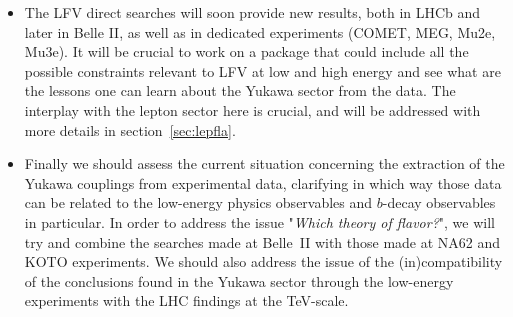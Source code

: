 \begin{itemize}
\item The LFV direct searches will soon provide new results, both in LHCb and later in Belle II, as well as in dedicated experiments (COMET, MEG, Mu2e, Mu3e). It will be crucial to work on a package that could include all the possible constraints relevant to LFV at low and high energy and see what are the lessons one can learn about the Yukawa sector from the data. The interplay with the lepton sector here is crucial, and will be addressed  with more details in section~\ref{sec:lepfla}. 
\item Finally we should assess the current situation concerning the extraction of the Yukawa couplings from experimental data, clarifying in which way those data can be related to the low-energy physics observables and 
$b$-decay observables in particular. In order to address the issue "{\it Which theory of flavor?}",  we will try and combine the searches made at Belle~II with those made at NA62 and KOTO experiments.  
We should also address the issue of the (in)compatibility of the conclusions found in the Yukawa sector through the low-energy experiments with the LHC findings at the TeV-scale. 
\end{itemize} 

%
%
%


